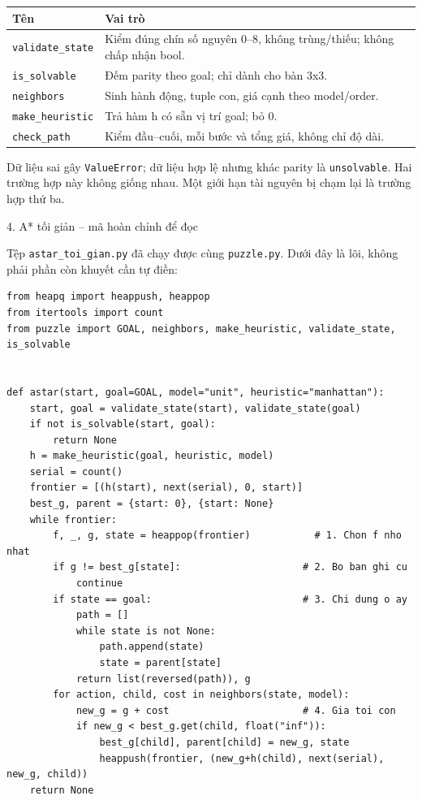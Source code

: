 \documentclass[11pt,a4paper]{article}
\newcommand{\pagehead}[1]{\clearpage\begin{tcolorbox}[colback=Ink,colframe=Ink,coltext=white,fontupper=\sffamily\large\bfseries,arc=1mm]#1\end{tcolorbox}}
\begin{document}
\par\begingroup\small\renewcommand{\arraystretch}{1.18}
\begin{tabularx}{\linewidth}{lX}\toprule
\textbf{Tên} & \textbf{Vai trò}\\\midrule
\texttt{validate\_state} & Kiểm đúng chín số nguyên 0--8, không trùng/thiếu; không chấp nhận bool.\\
\texttt{is\_solvable} & Đếm parity theo goal; chỉ dành cho bàn 3x3.\\
\texttt{neighbors} & Sinh hành động, tuple con, giá cạnh theo model/order.\\
\texttt{make\_heuristic} & Trả hàm h có sẵn vị trí goal; bỏ 0.\\
\texttt{check\_path} & Kiểm đầu--cuối, mỗi bước và tổng giá, không chỉ độ dài.\\
\bottomrule\end{tabularx}\endgroup\par

Dữ liệu sai gây \texttt{ValueError}; dữ liệu hợp lệ nhưng khác parity là \texttt{unsolvable}.
Hai trường hợp này không giống nhau. Một giới hạn tài nguyên bị chạm lại là trường hợp thứ ba.

\pagehead{4. A* tối giản -- mã hoàn chỉnh để đọc}
Tệp \texttt{astar\_toi\_gian.py} đã chạy được cùng \texttt{puzzle.py}. Dưới đây là lõi,
không phải phần còn khuyết cần tự điền:

\begin{lstlisting}
from heapq import heappush, heappop
from itertools import count
from puzzle import GOAL, neighbors, make_heuristic, validate_state, is_solvable


def astar(start, goal=GOAL, model="unit", heuristic="manhattan"):
    start, goal = validate_state(start), validate_state(goal)
    if not is_solvable(start, goal):
        return None
    h = make_heuristic(goal, heuristic, model)
    serial = count()
    frontier = [(h(start), next(serial), 0, start)]
    best_g, parent = {start: 0}, {start: None}
    while frontier:
        f, _, g, state = heappop(frontier)           # 1. Chon f nho nhat
        if g != best_g[state]:                     # 2. Bo ban ghi cu
            continue
        if state == goal:                          # 3. Chi dung o ay
            path = []
            while state is not None:
                path.append(state)
                state = parent[state]
            return list(reversed(path)), g
        for action, child, cost in neighbors(state, model):
            new_g = g + cost                       # 4. Gia toi con
            if new_g < best_g.get(child, float("inf")):
                best_g[child], parent[child] = new_g, state
                heappush(frontier, (new_g+h(child), next(serial), new_g, child))
    return None

\end{lstlisting}
\end{document}
